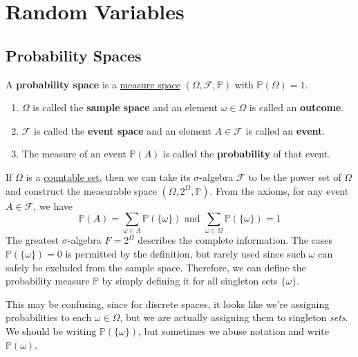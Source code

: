 \section{Random Variables}

\subsection{Probability Spaces} 

  \begin{definition}
    \label{def:probability-space}
    A \textbf{probability space} is a \hyperref[mt-def:measure-space]{measure space} $(\Omega, \mathcal{F}, \mathbb{P})$ with $\mathbb{P}(\Omega) = 1$. 
    \begin{enumerate}
      \item $\Omega$ is called the \textbf{sample space} and an element $\omega \in \Omega$ is called an \textbf{outcome}. 
      \item $\mathcal{F}$ is called the \textbf{event space} and an element $A \in \mathcal{F}$ is called an \textbf{event}. 
      \item The measure of an event $\mathbb{P}(A)$ is called the \textbf{probability} of that event. 
    \end{enumerate}
  \end{definition}

  \begin{definition}
    \label{def:discrete-probability-space}
    If $\Omega$ is a \hyperref[st-def:countable]{countable set}, then we can take its $\sigma$-algebra $\mathcal{F}$ to be the power set of $\Omega$ and construct the measurable space $(\Omega, 2^\Omega, \mathbb{P})$. From the axioms, for any event $A \in \mathcal{F}$, we have
    \begin{equation}
      \mathbb{P} (A) = \sum_{\omega \in A} \mathbb{P}(\{\omega\}) \text{ and } \sum_{\omega \in \Omega} \mathbb{P}(\{\omega\}) = 1
    \end{equation}
    The greatest $\sigma$-algebra $F = 2^{\Omega}$ describes the complete information. The cases $\mathbb{P}(\{\omega\}) = 0$ is permitted by the definition, but rarely used since such $\omega$ can safely be excluded from the sample space. Therefore, we can define the probability measure $\mathbb{P}$ by simply defining it for all singleton sets $\{\omega\}$. 
  \end{definition}

  This may be confusing, since for discrete spaces, it looks like we're assigning probabilities to each $\omega \in \Omega$, but we are actually assigning them to singleton \textit{sets}. We should be writing $\mathbb{P}(\{\omega\})$, but sometimes we abuse notation and write $\mathbb{P}(\omega)$. 

